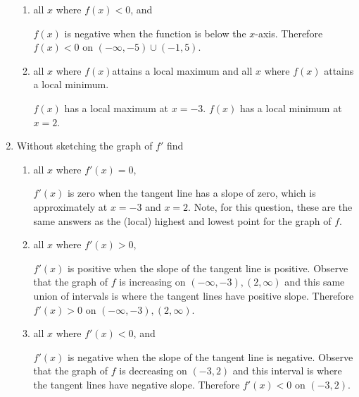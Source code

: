 \documentclass[nooutcomes]{ximera}
\begin{document}
\begin{problem}
\begin{enumerate}
\begin{enumerate}
        \item
          all $x$ where $f(x) < 0$, and
          \begin{freeResponse}
            $f(x)$ is negative when the function is below the $x$-axis.
            Therefore $f(x) < 0$ on $(-\infty ,-5) \cup (-1,5)$.
          \end{freeResponse}

        \item
          all $x$ where $f(x)$attains a local maximum and all $x$ where $f(x)$ attains a local minimum.
          \begin{freeResponse}
            $f(x)$ has a local maximum at $x=-3$.
            $f(x)$ has a local minimum at $x=2$.
          \end{freeResponse}
      \end{enumerate}

    \item

      Without sketching the graph of $f'$ find
      \begin{enumerate}
        \item 
          all $x$ where $f'(x) = 0$,
          \begin{freeResponse}
            $f'(x)$ is zero when the tangent line has a slope of zero, which is approximately at $x=-3$ and $x=2$.
            Note, for this question, these are the same answers as the (local) highest and lowest point for the graph of $f$.   
          \end{freeResponse}

        \item
          all $x$ where $f'(x) > 0$,
          \begin{freeResponse}
            ${f}'(x)$ is positive when the slope of the tangent line is positive.
            Observe that the graph of $f$ is increasing on $(-\infty ,-3), (2,\infty)$ and this same union of intervals is where the tangent lines have positive slope.
            Therefore $f'(x) > 0$ on $(-\infty ,-3), (2,\infty)$.
          \end{freeResponse}
        
        \item
          all $x$ where $f'(x) < 0$, and
          \begin{freeResponse}
            ${f}'(x)$ is negative when the slope of the tangent line is negative.
            Observe that the graph of $f$ is decreasing on $(-3,2)$ and this interval is where the tangent lines have negative slope.
            Therefore $f'(x) < 0$ on $(-3,2)$.
          \end{freeResponse}


\end{enumerate}
\end{enumerate}
\end{problem}
\end{document}
